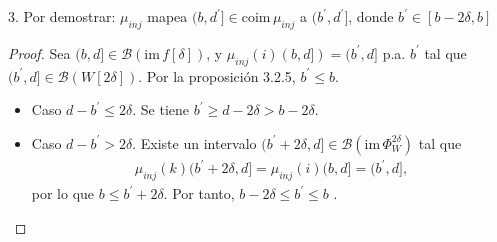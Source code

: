 \documentclass{beamer}
\begin{document}
\begin{frame}{3. Por demostrar: $\mu_{inj}$ mapea $(b, d^{\prime}]\in \mbox{coim}\,\mu_{inj}$ a $(b^{\prime}, d^\prime ]$, donde $b^\prime \in [b - 2\delta, b]$}
\begin{proof}
Sea $(b,d]\in\mathcal{B}(\mbox{im}\,f[\delta])$, y $\mu_{inj}(i)(b,d])=(b^{\prime},d]$ p.a. $b^{\prime}$ tal que $(b^{\prime},d]\in\mathcal{B}(W[2\delta])$. Por la proposici\'on 3.2.5, $b^{\prime}\leq b$.
\begin{itemize}
\item Caso $d-b^{\prime}\leq 2\delta$. Se tiene $b^{\prime}\geq d-2\delta > b-2\delta$.
\item Caso $d-b^{\prime}>2\delta$. Existe un intervalo $(b^{\prime} + 2\delta, d] \in \mathcal{B}(\mbox{im}\, \Phi^{2\delta}_{W})$ tal que
\begin{gather*}
\mu_{inj} (k)(b^{\prime} + 2\delta, d] = \mu_{inj} (i)(b, d] = (b^{\prime}, d],
\end{gather*}
por lo que $b \leq b^{\prime} + 2\delta$. Por tanto, $b-2\delta \leq b^{\prime} \leq b$ .
\end{itemize}
\end{proof}
\end{frame}
\end{document}
